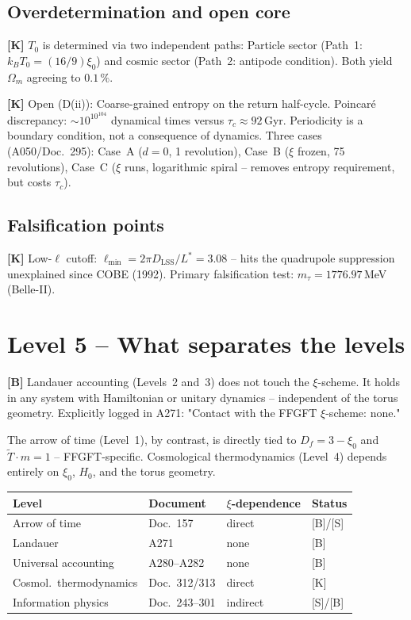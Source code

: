 \subsection{Overdetermination and open core}

\textbf{[K]} $T_0$ is determined via two independent paths:
Particle sector (Path~1: $k_BT_0 = (16/9)\xi_0$) and cosmic sector
(Path~2: antipode condition). Both yield $\Omega_m$ agreeing to
$0.1\,\%$.

\textbf{[K]} Open (D(ii)): Coarse-grained entropy on the
return half-cycle. Poincar\'e discrepancy: $\sim 10^{10^{104}}$ dynamical
times versus $\tau_c \approx 92$\,Gyr. Periodicity is a boundary
condition, not a consequence of dynamics. Three cases (A050/Doc.~295):
Case~A ($d=0$, 1 revolution), Case~B ($\xi$ frozen, 75 revolutions),
Case~C ($\xi$ runs, logarithmic spiral -- removes entropy requirement,
but costs $\tau_c$).

\subsection{Falsification points}

\textbf{[K]} Low-$\ell$ cutoff: $\ell_\text{min} = 2\pi D_\text{LSS}/L^* = 3.08$
-- hits the quadrupole suppression unexplained since COBE (1992).
Primary falsification test: $m_\tau = 1776.97$\,MeV (Belle-II).

\section{Level 5 -- What separates the levels}

\textbf{[B]} Landauer accounting (Levels~2 and~3) does not touch the
$\xi$-scheme. It holds in any system with Hamiltonian or unitary
dynamics -- independent of the torus geometry. Explicitly logged
in A271: "Contact with the FFGFT $\xi$-scheme: none."

The arrow of time (Level~1), by contrast, is directly tied to
$D_f = 3-\xi_0$ and $\tilde{T} \cdot m = 1$ -- FFGFT-specific.
Cosmological thermodynamics (Level~4) depends entirely on
$\xi_0$, $H_0$, and the torus geometry.

\begin{center}
	\small
	\begin{tabular}{@{}p{}p{}p{}p{}@{}}
		\toprule
		\textbf{Level} & \textbf{Document} & \textbf{$\xi$-dependence} & \textbf{Status} \\
		\midrule
		Arrow of time & Doc.~157 & direct & [B]/[S] \\
		Landauer & A271 & none & [B] \\
		Universal accounting & A280--A282 & none & [B] \\
		Cosmol.\ thermodynamics & Doc.~312/313 & direct & [K] \\
		Information physics & Doc.~243--301 & indirect & [S]/[B] \\
		\bottomrule
	\end{tabular}
\end{center}

